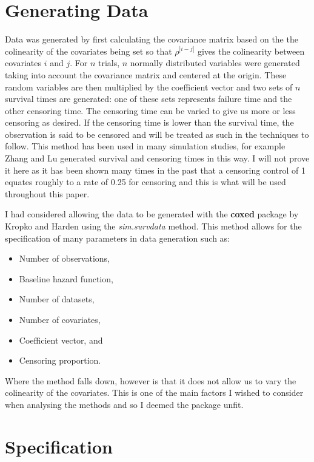 \section{Generating Data}

Data was generated by first calculating the covariance matrix based on the the colinearity of the covariates being set so that  $\rho^{|i-j|}$ gives the colinearity between covariates $i$ and $j$. For $n$ trials, $n$ normally distributed variables were generated taking into account the covariance matrix and centered at the origin. These random variables are then multiplied by the coefficient vector and two sets of $n$ survival times are generated: one of these sets represents failure time and the other censoring time. The censoring time can be varied to give us more or less censoring as desired. If the censoring time is lower than the survival time, the observation is said to be censored and will be treated as such in the techniques to follow. This method has been used in many simulation studies, for example Zhang and Lu  generated survival and censoring times in this way. I will not prove it here as it has been shown many times in the past that a censoring control of 1 equates roughly to a rate of 0.25 for censoring and this is what will be used throughout this paper.

I had considered allowing the data to be generated with the \textbf{coxed} package by Kropko and Harden  using the \emph{sim.survdata} method. This method allows for the specification of many parameters in data generation such as:

\begin{itemize}
    \item Number of observations,
    \item Baseline hazard function,
    \item Number of datasets,
    \item Number of covariates,
    \item Coefficient vector, and
    \item Censoring proportion.
\end{itemize}

Where the method falls down, however is that it does not allow us to vary the colinearity of the covariates. This is one of the main factors I wished to consider when analysing the methods and so I deemed the package unfit.

\section{Specification}\label{sec:spec}

